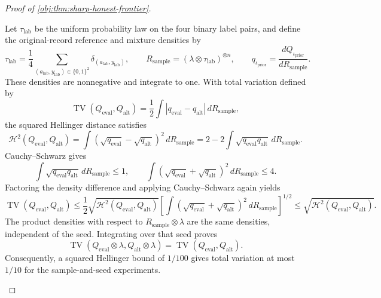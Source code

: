 \begin{proof}[Proof of \cref{obj:thm:sharp-honest-frontier}]
\begin{enumerate}
Let \(\tau_{\mathrm{lab}}\) be the uniform probability law on the four binary
label pairs, and define the original-record reference and mixture densities by
\[
\tau_{\mathrm{lab}}
=\frac14\sum_{(a_{\mathrm{lab}},y_{\mathrm{lab}})\in\{0,1\}^2}
\delta_{(a_{\mathrm{lab}},y_{\mathrm{lab}})},
\qquad
R_{\mathrm{sample}}=(\lambda\otimes\tau_{\mathrm{lab}})^{\otimes n},
\qquad
q_{\iota_{\mathrm{prior}}}=\frac{dQ_{\iota_{\mathrm{prior}}}}{dR_{\mathrm{sample}}}.
\]
These densities are nonnegative and integrate to one. With total variation defined by
\[
\operatorname{TV}(Q_{\mathrm{eval}},Q_{\mathrm{alt}})
=
\frac12\int
|q_{\mathrm{eval}}-q_{\mathrm{alt}}|\,dR_{\mathrm{sample}},
\]
the squared Hellinger distance satisfies
\[
\mathcal H^2(Q_{\mathrm{eval}},Q_{\mathrm{alt}})
=
\int
(\sqrt{q_{\mathrm{eval}}}-\sqrt{q_{\mathrm{alt}}})^2\,dR_{\mathrm{sample}}
=
2-2\int\sqrt{q_{\mathrm{eval}}q_{\mathrm{alt}}}\,dR_{\mathrm{sample}}.
\]
Cauchy--Schwarz gives
\[
\int\sqrt{q_{\mathrm{eval}}q_{\mathrm{alt}}}\,dR_{\mathrm{sample}}\le1,
\qquad
\int(\sqrt{q_{\mathrm{eval}}}+\sqrt{q_{\mathrm{alt}}})^2
\,dR_{\mathrm{sample}}\le4.
\]
Factoring the density difference and applying Cauchy--Schwarz again yields
\[
\operatorname{TV}(Q_{\mathrm{eval}},Q_{\mathrm{alt}})
\le
\frac12
\sqrt{\mathcal H^2(Q_{\mathrm{eval}},Q_{\mathrm{alt}})}
\left[
\int(\sqrt{q_{\mathrm{eval}}}+\sqrt{q_{\mathrm{alt}}})^2
\,dR_{\mathrm{sample}}
\right]^{1/2}
\le
\sqrt{\mathcal H^2(Q_{\mathrm{eval}},Q_{\mathrm{alt}})}.
\]
The product densities with respect to
\(R_{\mathrm{sample}}\otimes\lambda\) are the same densities, independent of
the seed. Integrating over that seed proves
\[
\operatorname{TV}(Q_{\mathrm{eval}}\otimes\lambda,
Q_{\mathrm{alt}}\otimes\lambda)
=
\operatorname{TV}(Q_{\mathrm{eval}},Q_{\mathrm{alt}}).
\]
Consequently, a squared Hellinger bound of \(1/100\) gives total variation
at most \(1/10\) for the sample-and-seed experiments.


\end{enumerate}
\end{proof}
